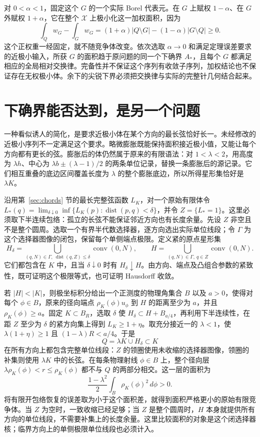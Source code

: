 对 $0<\alpha<1$，固定这个 $G$ 的一个实际 Borel 代表元。在 $G$ 上赋权 $1-\alpha$、在 $G$ 外赋权 $1+\alpha$，它在整个 $\mathcal X$ 上极小化这一加权面积，因为
\[
 \int_Q w_G-\int_G w_G
   =(1+\alpha)|Q\setminus G|-(1-\alpha)|G\setminus Q|\ge0.
\]
这个正权重一经固定，就不随竞争体改变。依次选取 $\alpha\to0$ 和满足定理误差要求的近极小输入，所获 $G$ 的面积趋于原问题的同一个下确界 $A_*$，且每个 $G$ 都满足相应的全局相对交换律。完备性并不保证这个序列有收敛子序列，加权结论也不保证存在无权极小体。余下的尖锐下界必须把交换律与实际的完整针几何结合起来。

\section{下确界能否达到，是另一个问题}\label{sec:attainment}
一种看似诱人的简化，是要求近极小体在某个方向的最长弦恰好长一。未经修改的近极小序列不一定满足这个要求。略微膨胀既能保持面积接近极小值，又能让每个方向都有更长的弦。膨胀后的体仍然属于原来的有限语法：对 $1<\lambda<2$，用高度为 $\lambda h$、中心为 $\lambda b\pm(\lambda-1)/2$ 的两条单位记录，替换一条膨胀后的源记录。它们相互重叠的底边区间覆盖长度为 $\lambda$ 的整个膨胀底边，所以所得星形集恰好是 $\lambda K$。

沿用第~\ref{sec:chords} 节的最长完整弦函数 $L_K$，对一个原始有限体令 $L_*(q)=\lim_{\delta\downarrow0}\inf\{L_K(p):\operatorname{dist}(p,q)<\delta\}$，并令 $Z=\{L_*=1\}$。这里必须取下半连续包络：孤立的长弦不能保证邻近方向也有长度余量。先设 $Z$ 非空且不是整个圆周。选取一个有界半代数选择器，逐方向选出实际单位线段；令 $\Gamma$ 为这个选择器图像的闭包，保留每个单侧端点极限。定义紧的原点星形集
\[
 H_\delta=\bigcup_{(q,N)\in\Gamma,\ \operatorname{dist}(q,Z)\le\delta}
                       \operatorname{conv}(0,N),\qquad
 H=\bigcup_{(q,N)\in\Gamma,\ q\in Z}\operatorname{conv}(0,N).
\]
它们都包含在 $K$ 中，且当 $\delta\downarrow0$ 时有 $H_\delta\downarrow H$。由方向、端点及凸组合参数的紧致性，既可证明这个极限等式，也可证明 Hausdorff 收敛。

若 $|H|<|K|$，则极坐标积分给出一个正测度的物理角集合 $B$ 以及 $a>0$，使得对每个 $\phi\in B$，原来的径向端点 $\rho_K(\phi)u_\phi$ 到 $H$ 的距离至少为 $a$，并且 $\rho_K(\phi)\ge a$。固定 $K\subset B_R$，选取 $\delta$ 使 $H_\delta\subset H+B_{a/4}$，再利用下半连续性，在距 $Z$ 至少为 $\delta$ 的紧方向集上得到 $L_K\ge1+\eta$。取充分接近一的 $\lambda<1$，使 $\lambda(1+\eta)\ge1$ 且 $(1-\lambda)R<a/4$。于是
\[
                        Q=\lambda K\cup H_\delta\subset K
\]
在所有方向上都包含完整单位线段：$Z$ 的领圈使用未收缩的选择器图像，领圈的补集则使用 $\lambda K$ 中的长弦。在每条物理射线 $\phi\in B$ 上，整个径向层 $\lambda\rho_K(\phi)<r\le\rho_K(\phi)$ 都不与 $Q$ 的两部分相交。这一层的面积为
\[
             \frac{1-\lambda^2}{2}\int_B\rho_K(\phi)^2\,d\phi>0.
\]
将有限开包络恢复的误差取为小于这个面积差，就得到面积严格更小的原始有限竞争体。当 $Z$ 为空时，一致收缩已经足够；当 $Z$ 是整个圆周时，$H$ 本身就提供所有方向的单位线段，不需要补集上的长度余量。这里比较面积的对象是这个闭选择器核；临界方向上的单侧极限单位线段也必须计入。

